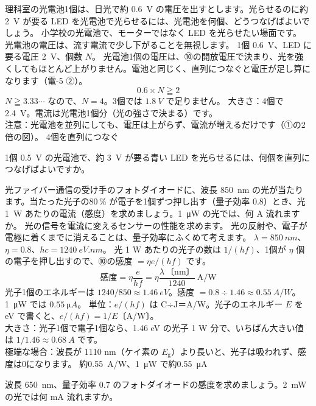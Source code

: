 \label{ph:原-9:ex11}
\begin{phreidai}
理科室の光電池1個は、日光で約 \qty{0.6}{V} の電圧を出すとします。光らせるのに約 \qty{2}{V} が要る LED を光電池で光らせるには、光電池を何個、どうつなげばよいでしょう。
\phbamen
小学校の光電池で、モーターではなく LED を光らせたい場面です。
\phmushi
光電池の電圧は、流す電流で少し下がることを無視します。
\phzu
1個 \qty{0.6}{V}、LED に要る電圧 \qty{2}{V}、個数 $N$。
\phriyu
光電池1個の電圧は、⑩の開放電圧で決まり、光を強くしてもほとんど上がりません。電池と同じく、直列につなぐと電圧が足し算になります（電-5 ②）。
\phtateru
\[ 0.6\times N\geqq2 \]
\phtoku
$N\geqq3.33\cdots$ なので、$N=4$。3個では $\qty{1.8}{V}$ で足りません。
\phtashikame
大きさ：4個で \qty{2.4}{V}。電流は光電池1個分（光の強さで決まる）です。\\
注意：光電池を並列にしても、電圧は上がらず、電流が増えるだけです（①の2倍の図）。
\kotae 4個を直列につなぐ
\end{phreidai}
\begin{jibun}
1個 \qty{0.5}{V} の光電池で、約 \qty{3}{V} が要る青い LED を光らせるには、何個を直列につなげばよいですか。
\end{jibun}

\label{ph:原-9:ex12}
\begin{phreidai}[フォトダイオードの感度]
光ファイバー通信の受け手のフォトダイオードに、波長 \qty{850}{nm} の光が当たります。当たった光子の80\,\% が電子を1個ずつ押し出す（量子効率 0.8）とき、光 \qty{1}{W} あたりの電流（感度）を求めましょう。\qty{1}{\micro W} の光では、何 A 流れますか。
\phbamen
光の信号を電流に変えるセンサーの性能を求めます。
\phmushi
光の反射や、電子が電極に着くまでに消えることは、量子効率にふくめて考えます。
\phzu
$\lambda=\qty{850}{nm}$、$\eta=0.8$、$hc=\qty{1240}{eV.nm}$。
\phriyu
光 1 W あたりの光子の数は $1/(hf)$、1個が $\eta$ 個の電子を押し出すので、⑩の感度 $=\eta e/(hf)$ です。
\phtateru
\[ \text{感度}=\eta\frac{e}{hf}=\eta\frac{\lambda\,\text{〔nm〕}}{1240}\ \text{A/W} \]
\phtoku
光子1個のエネルギーは $1240/850\approx\qty{1.46}{eV}$。感度 $=0.8\div1.46\approx\qty{0.55}{A/W}$。\qty{1}{\micro W} では $\qty{0.55}{\micro A}$。
\phtashikame
単位：$e/(hf)$ は C÷J＝A/W。光子のエネルギー $E$ を eV で書くと、$e/(hf)=1/E$〔A/W〕。\\
大きさ：光子1個で電子1個なら、1.46 eV の光子 1 W 分で、いちばん大きい値は $1/1.46\approx\qty{0.68}{A}$ です。\\
極端な場合：波長が 1110 nm（ケイ素の $E_{\mathrm g}$）より長いと、光子は吸われず、感度は0になります。
\kotae 約\qty{0.55}{A/W}、\qty{1}{\micro W} で約\qty{0.55}{\micro A}
\end{phreidai}
\begin{jibun}
波長 \qty{650}{nm}、量子効率 0.7 のフォトダイオードの感度を求めましょう。\qty{2}{mW} の光では何 mA 流れますか。
\end{jibun}

